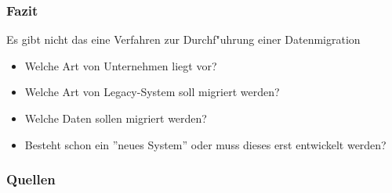 \documentclass{beamer}
\begin{document}
	\begin{frame}
		\frametitle{Fazit}
		
		Es gibt nicht das eine Verfahren zur Durchf"uhrung einer Datenmigration
		\begin{itemize}
			\item Welche Art von Unternehmen liegt vor?
			\item Welche Art von Legacy-System soll migriert werden?
			\item Welche Daten sollen migriert werden?
			\item Besteht schon ein ''neues System'' oder muss dieses erst entwickelt werden?
		\end{itemize}
	\end{frame}
	
	
	
	\begin{frame}
		\frametitle{Quellen}
						
		
		
	\end{frame}
	
\end{document}
